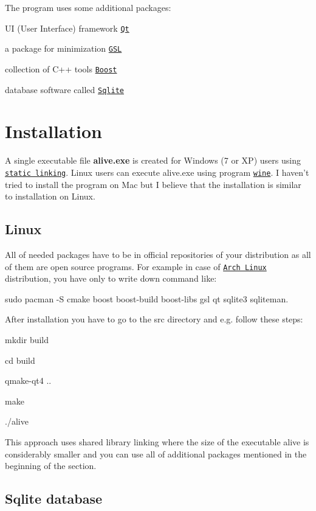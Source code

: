 The program uses some additional packages\-:
\begin{DoxyItemize}
\item U\-I (User Interface) framework \href{http://qt-project.org/}{\tt Qt}
\item a package for minimization \href{http://www.gnu.org/software/gsl/}{\tt G\-S\-L}
\item collection of {\ttfamily C++} tools \href{http://www.boost.org/}{\tt Boost}
\item database software called \href{http://www.sqlite.org}{\tt Sqlite}
\end{DoxyItemize}\hypertarget{index_Installation}{}\section{Installation}\label{index_Installation}
A single executable file {\bfseries alive.\-exe} is created for Windows (7 or X\-P) users using \href{http://pic.dhe.ibm.com/infocenter/aix/v7r1/index.jsp?topic=%2Fcom.ibm.aix.prftungd%2Fdoc%2Fprftungd%2Fwhen_dyn_linking_static_linking.htm}{\tt static linking}. Linux users can execute {\ttfamily alive.\-exe} using program \href{http://www.winehq.org/}{\tt wine}. I haven't tried to install the program on Mac but I believe that the installation is similar to installation on Linux. \hypertarget{index_Linux}{}\subsection{Linux}\label{index_Linux}
All of needed packages have to be in official repositories of your distribution as all of them are open source programs. For example in case of \href{https://www.archlinux.org/}{\tt Arch Linux} distribution, you have only to write down command like\-:\par
 {\ttfamily sudo pacman -\/\-S cmake boost boost-\/build boost-\/libs gsl qt sqlite3 sqliteman}.\par
 After installation you have to go to the src directory and e.\-g. follow these steps\-:\par
 {\ttfamily  mkdir build\par
 cd build\par
 qmake-\/qt4 ..\par
 make\par
 ./alive\par
 } This approach uses shared library linking where the size of the executable {\ttfamily alive} is considerably smaller and you can use all of additional packages mentioned in the beginning of the section.\hypertarget{index_sql_win}{}\subsection{Sqlite database}\label{index_sql_win}
